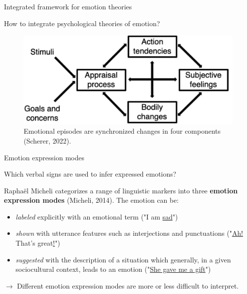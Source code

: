 \documentclass[handout,10pt]{beamer}
\begin{document}
\begin{frame}{Integrated framework for emotion theories}

How to integrate psychological theories of emotion?

\pause
\vspace{0.5cm}


\begin{figure}
    \centering
    \includegraphics[width=0.8\linewidth]{img/scherer_integrated_framework.png}
    \caption{Emotional episodes are synchronized changes in four components (Scherer, 2022).}
    \label{fig:placeholder}
\end{figure}
    
\end{frame}

\begin{frame}{Emotion expression modes}

Which verbal signs are used to infer expressed emotions?

\pause
\vspace{0.5cm}

Raphaël Micheli categorizes a range of linguistic markers into three \textbf{emotion expression modes} (Micheli, 2014). The emotion can be: 

\pause
\vspace{0.5cm}

\begin{itemize}[<+->]
    \item \textit{labeled} explicitly with an emotional term ("I am \underline{sad}")
    \item \textit{shown} with utterance features such as interjections and punctuations ("\underline{Ah!} That's great\underline{!}")
    \item \textit{suggested} with the description of a situation which generally, in a given sociocultural context, leads to an emotion ("\underline{She gave me a gift}")
\end{itemize}

\pause
\vspace{0.5cm}

$\rightarrow$ Different emotion expression modes are more or less difficult to interpret.
\end{frame}
\end{document}
